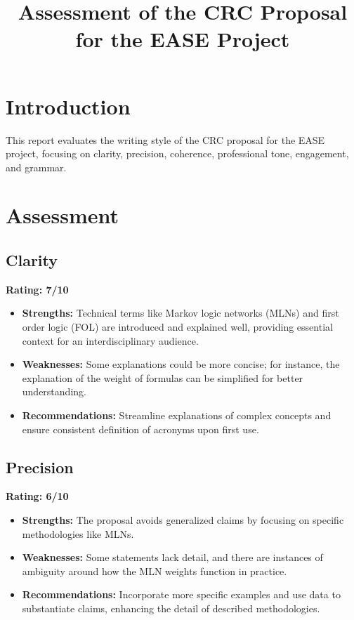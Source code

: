 \documentclass{article}
\begin{document}
\title{Assessment of the CRC Proposal for the EASE Project}
\author{}
\date{}
\maketitle

\section{Introduction}
This report evaluates the writing style of the CRC proposal for the EASE project, focusing on clarity, precision, coherence, professional tone, engagement, and grammar.

\section{Assessment}

\subsection{Clarity}
\textbf{Rating: 7/10}

\begin{itemize}
    \item \textbf{Strengths:} Technical terms like Markov logic networks (MLNs) and first order logic (FOL) are introduced and explained well, providing essential context for an interdisciplinary audience.
    \item \textbf{Weaknesses:} Some explanations could be more concise; for instance, the explanation of the weight of formulas can be simplified for better understanding.
    \item \textbf{Recommendations:} Streamline explanations of complex concepts and ensure consistent definition of acronyms upon first use.
\end{itemize}

\subsection{Precision}
\textbf{Rating: 6/10}

\begin{itemize}
    \item \textbf{Strengths:} The proposal avoids generalized claims by focusing on specific methodologies like MLNs.
    \item \textbf{Weaknesses:} Some statements lack detail, and there are instances of ambiguity around how the MLN weights function in practice.
    \item \textbf{Recommendations:} Incorporate more specific examples and use data to substantiate claims, enhancing the detail of described methodologies.
\end{itemize}
\end{document}
